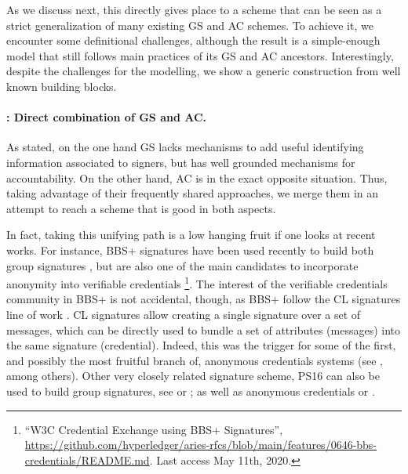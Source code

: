 As we discuss next, this directly gives place to a scheme that can be seen as a
strict generalization of many existing GS and AC schemes. To achieve it, we
encounter some definitional challenges, although the result is a simple-enough
model that still follows main practices of its GS and AC ancestors.
Interestingly, despite the challenges for the modelling, we show a generic
construction from well known building blocks.

\paragraph{\GSAC: Direct combination of GS and AC.} %
As stated, on the one hand GS lacks mechanisms to add useful identifying
information associated to signers, but has well grounded mechanisms for
accountability. On the other hand, AC is in the exact opposite situation. Thus,
taking advantage of their frequently shared approaches, we merge them in an
attempt to reach a scheme that is good in both aspects.

In fact, taking this unifying path is a low hanging fruit if one looks at recent
works. For instance, BBS+ signatures \cite{asm06,cdl16b} have been used recently
to build both group signatures \cite{gl19,dl21,fgl21}, but are also one of the
main candidates to incorporate anonymity into verifiable credentials%
\footnote{``W3C Credential Exchange using BBS+ Signatures'',
  \url{https://github.com/hyperledger/aries-rfcs/blob/main/features/0646-bbs-credentials/README.md}. Last access May 11th, 2020.}.%
The interest of the verifiable credentials community in BBS+ is not accidental,
though, as BBS+ follow the CL signatures line of work \cite{cl02}. CL signatures
allow creating a single signature over a set of messages, which can be directly
used to bundle a set of attributes (messages) into the same signature
(credential). Indeed, this was the trigger for some of the first, and possibly
the most fruitful branch of, anonymous credentials systems (see
\cite{cl01,cl02,cl04}, among others). Other very closely related signature
scheme, PS16 \cite{ps16} can
also be used to build group signatures, see \cite[Appendix A.1]{ps15} or
\cite{cdl+20}; as well as anonymous credentials \cite[Appendix A.2]{ps15} or
\cite{sms+19}.

